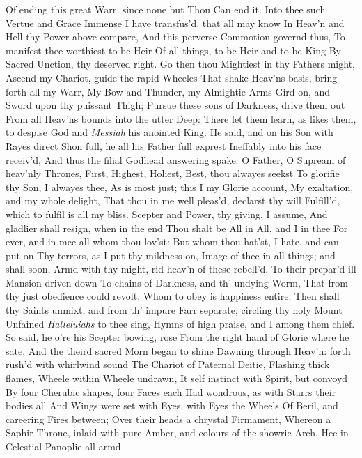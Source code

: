 \documentclass[11pt]{book}
\begin{document}
Of ending this great Warr, since none but Thou 
Can end it.  Into thee such Vertue and Grace 
Immense I have transfus'd, that all may know 
In Heav'n and Hell thy Power above compare, 
And this perverse Commotion governd thus, 
To manifest thee worthiest to be Heir 
Of all things, to be Heir and to be King 
By Sacred Unction, thy deserved right. 
Go then thou Mightiest in thy Fathers might, 
Ascend my Chariot, guide the rapid Wheeles 
That shake Heav'ns basis, bring forth all my Warr, 
My Bow and Thunder, my Almightie Arms 
Gird on, and Sword upon thy puissant Thigh; 
Pursue these sons of Darkness, drive them out 
From all Heav'ns bounds into the utter Deep: 
There let them learn, as likes them, to despise 
God and \textit{Messiah} his anointed King. 
\quad He said, and on his Son with Rayes direct 
Shon full, he all his Father full exprest 
Ineffably into his face receiv'd, 
And thus the filial Godhead answering spake. 
\quad O Father, O Supream of heav'nly Thrones, 
First, Highest, Holiest, Best, thou alwayes seekst 
To glorifie thy Son, I alwayes thee, 
As is most just; this I my Glorie account, 
My exaltation, and my whole delight, 
That thou in me well pleas'd, declarst thy will 
Fulfill'd, which to fulfil is all my bliss. 
Scepter and Power, thy giving, I assume, 
And gladlier shall resign, when in the end 
Thou shalt be All in All, and I in thee 
For ever, and in mee all whom thou lov'st: 
But whom thou hat'st, I hate, and can put on 
Thy terrors, as I put thy mildness on, 
Image of thee in all things; and shall soon, 
Armd with thy might, rid heav'n of these rebell'd, 
To their prepar'd ill Mansion driven down 
To chains of Darkness, and th' undying Worm, 
That from thy just obedience could revolt, 
Whom to obey is happiness entire. 
Then shall thy Saints unmixt, and from th' impure 
Farr separate, circling thy holy Mount 
Unfained \textit{Halleluiahs} to thee sing, 
Hymns of high praise, and I among them chief. 
So said, he o're his Scepter bowing, rose 
From the right hand of Glorie where he sate, 
And the theird sacred Morn began to shine 
Dawning through Heav'n: forth rush'd with whirlwind sound 
The Chariot of Paternal Deitie, 
Flashing thick flames, Wheele within Wheele undrawn, 
It self instinct with Spirit, but convoyd 
By four Cherubic shapes, four Faces each 
Had wondrous, as with Starrs their bodies all 
And Wings were set with Eyes, with Eyes the Wheels 
Of Beril, and careering Fires between; 
Over their heads a chrystal Firmament, 
Whereon a Saphir Throne, inlaid with pure 
Amber, and colours of the showrie Arch. 
Hee in Celestial Panoplie all armd 
\end{document}
